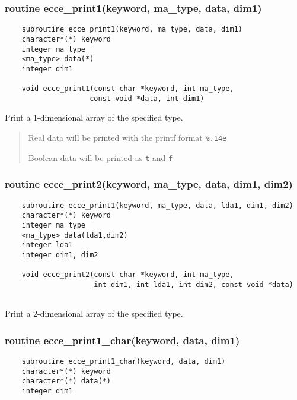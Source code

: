 \subsubsection{ routine ecce\_print1(keyword, ma\_type, data, dim1) }

\begin{verbatim}
    subroutine ecce_print1(keyword, ma_type, data, dim1)
    character*(*) keyword
    integer ma_type
    <ma_type> data(*)
    integer dim1

    void ecce_print1(const char *keyword, int ma_type,  
                    const void *data, int dim1)
\end{verbatim}

Print a 1-dimensional array of the specified type.  

    \begin{quotation}

      Real data will be printed with the printf format \verb+%.14e+

      Boolean data will be printed as \verb+t+ and \verb+f+

     \end{quotation}

\subsubsection{ routine ecce\_print2(keyword, ma\_type, data, dim1, dim2)}

\begin{verbatim}
    subroutine ecce_print1(keyword, ma_type, data, lda1, dim1, dim2)
    character*(*) keyword
    integer ma_type
    <ma_type> data(lda1,dim2)
    integer lda1
    integer dim1, dim2

    void ecce_print2(const char *keyword, int ma_type, 
                     int dim1, int lda1, int dim2, const void *data)
                    
\end{verbatim}

Print a 2-dimensional array of the specified type.  

\subsubsection{ routine ecce\_print1\_char(keyword, data, dim1) }

\begin{verbatim}
    subroutine ecce_print1_char(keyword, data, dim1)
    character*(*) keyword
    character*(*) data(*)
    integer dim1
\end{verbatim}

